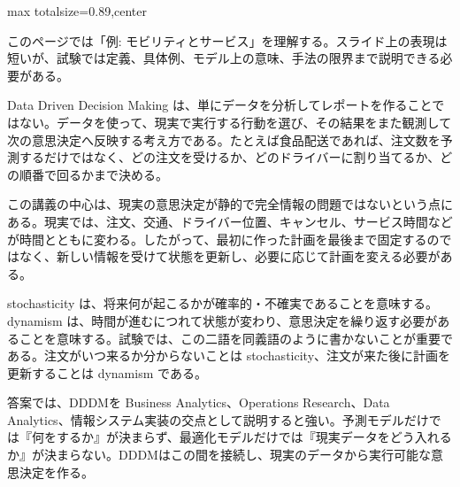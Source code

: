 \begin{minipage}[t]{0.58\textwidth}
\begin{adjustbox}{max totalsize={\textwidth}{0.89\textheight},center}
\begin{minipage}{\textwidth}\scriptsize
{}このページでは「例: モビリティとサービス」を理解する。スライド上の表現は短いが、試験では定義、具体例、モデル上の意味、手法の限界まで説明できる必要がある。\par
Data Driven Decision Making は、単にデータを分析してレポートを作ることではない。データを使って、現実で実行する行動を選び、その結果をまた観測して次の意思決定へ反映する考え方である。たとえば食品配送であれば、注文数を予測するだけではなく、どの注文を受けるか、どのドライバーに割り当てるか、どの順番で回るかまで決める。\par
この講義の中心は、現実の意思決定が静的で完全情報の問題ではないという点にある。現実では、注文、交通、ドライバー位置、キャンセル、サービス時間などが時間とともに変わる。したがって、最初に作った計画を最後まで固定するのではなく、新しい情報を受けて状態を更新し、必要に応じて計画を変える必要がある。\par
stochasticity は、将来何が起こるかが確率的・不確実であることを意味する。dynamism は、時間が進むにつれて状態が変わり、意思決定を繰り返す必要があることを意味する。試験では、この二語を同義語のように書かないことが重要である。注文がいつ来るか分からないことは stochasticity、注文が来た後に計画を更新することは dynamism である。\par
答案では、DDDMを Business Analytics、Operations Research、Data Analytics、情報システム実装の交点として説明すると強い。予測モデルだけでは『何をするか』が決まらず、最適化モデルだけでは『現実データをどう入れるか』が決まらない。DDDMはこの間を接続し、現実のデータから実行可能な意思決定を作る。\par

\end{minipage}
\end{adjustbox}
\end{minipage}
